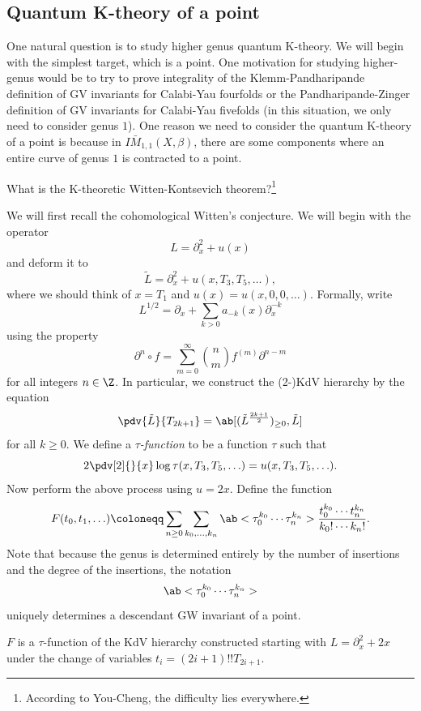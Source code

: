 \subsection{Quantum K-theory of a point}%
\label{sub:Quantum K-theory of a point}

One natural question is to study higher genus quantum K-theory. We will begin with the simplest target, which is a point. One motivation for studying higher-genus would be to try to prove integrality of the Klemm-Pandharipande definition of GV invariants for Calabi-Yau fourfolds or the Pandharipande-Zinger definition of GV invariants for Calabi-Yau fivefolds (in this situation, we only need to consider genus \(1\)). One reason we need to consider the quantum K-theory of a point is because in \(I\bar{M}_{1,1}(X, \beta)\), there are some components where an entire curve of genus \(1\) is contracted to a point.

\begin{quest}
    What is the K-theoretic Witten-Kontsevich theorem?\footnote{According to You-Cheng, the difficulty lies everywhere.}
\end{quest}

We will first recall the cohomological Witten's conjecture. We will begin with the operator
\[ L = \partial_x^2 + u(x) \]
and deform it to
\[ \tilde{L} = \partial_x^2 + u(x, T_3, T_5, \ldots), \]
where we should think of \(x = T_1\) and \(u(x) = u(x, 0, 0,\ldots)\). Formally, write
\[ L^{1/2} = \partial_x + \sum_{k > 0} a_{-k}(x) \partial_x^{-k} \]
using the property
\[ \partial^n \circ f = \sum_{m = 0}^{\infty} \binom{n}{m} f^{(m)} \partial^{n-m} \]
for all integers \(n \in \Z\). In particular, we construct the (2-)KdV hierarchy by the equation
\[ \pdv{\tilde{L}}{T_{2k+1}} = \ab[(\tilde{L}^{\frac{2k+1}{2}})_{\geq 0}, \tilde{L}] \]
for all \(k \geq 0\). We define a \textit{\(\tau\)-function} to be a function \(\tau\) such that 
\[ 2 \pdv[2]{}{x}\log \tau(x, T_3, T_5, \ldots) = u(x, T_3, T_5, \ldots). \]
Now perform the above process using \(u = 2x\). Define the function
\[ F(t_0, t_1, \ldots) \coloneqq \sum_{n \geq 0} \sum_{k_0, \ldots, k_n} \ab<\tau_0^{k_0} \cdots \tau_n^{k_n}> \frac{t_0^{k_0} \cdots t_n^{k_n}}{k_0! \cdots k_n!}. \]
Note that because the genus is determined entirely by the number of insertions and the degree of the insertions, the notation
\[ \ab<\tau_0^{k_0} \cdots \tau_n^{k_n}> \]
uniquely determines a descendant GW invariant of a point.

\begin{thm}
    \(F\) is a \(\tau\)-function of the KdV hierarchy constructed starting with \(L = \partial_x^2 + 2x\) under the change of variables \(t_i = (2i+1)!! T_{2i+1}\).
\end{thm}

